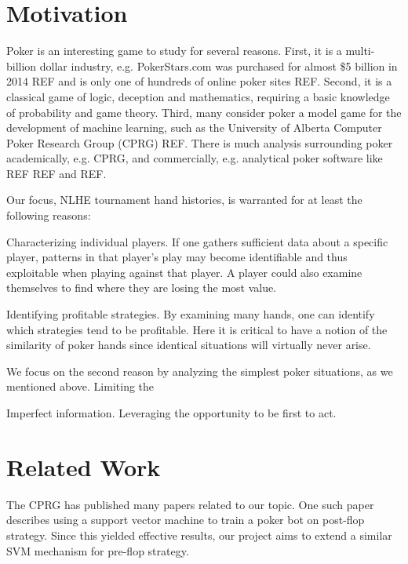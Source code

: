 \documentclass[twoside]{article}
\begin{document}
\begin{multicols}{2}


\section{Motivation}

Poker is an interesting game to study for several reasons. First, it is a multi-billion dollar industry, e.g. PokerStars.com was purchased for almost \$5 billion in 2014 REF and is only one of hundreds of online poker sites REF. Second, it is a classical game of logic, deception and mathematics, requiring a basic knowledge of probability and game theory. Third, many consider poker a model game for the development of machine learning, such as the University of Alberta Computer Poker Research Group (CPRG) REF. There is much analysis surrounding poker academically, e.g. CPRG, and commercially, e.g. analytical poker software like REF REF and REF.

Our focus, NLHE tournament hand histories, is warranted for at least the following reasons:

\begin{compactitem}
	\item Characterizing individual players. If one gathers sufficient data about a specific player, patterns in that player's play may become identifiable and thus exploitable when playing against that player. A player could also examine themselves to find where they are losing the most value.
	\item Identifying profitable strategies. By examining many hands, one can identify which strategies tend to be profitable. Here it is critical to have a notion of the similarity of poker hands since identical situations will virtually never arise.
\end{compactitem}

We focus on the second reason by analyzing the simplest poker situations, as we mentioned above. Limiting the 

Imperfect information.
Leveraging the opportunity to be first to act. 


\section{Related Work}

The CPRG has published many papers related to our topic.
One such paper \cite{SVMPoker} describes using a support vector machine to train a poker bot on post-flop strategy. Since this yielded effective results, our project aims to extend a similar SVM mechanism for pre-flop strategy.


\end{multicols}
\end{document}
